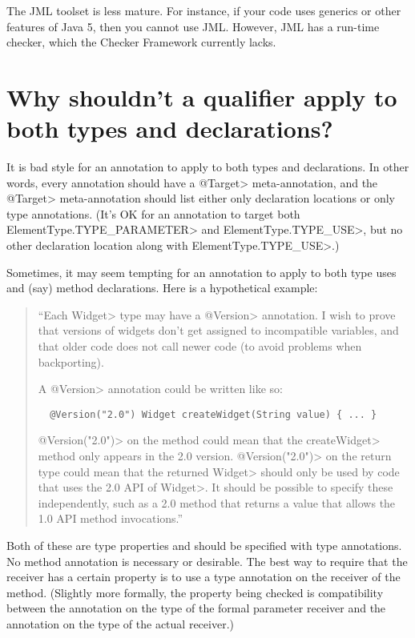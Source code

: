 The JML toolset is less mature.  For instance, if your code uses
generics or other features of Java 5, then you cannot use JML.  
However, JML has a run-time checker, which the Checker Framework currently
lacks.


\section{Why shouldn't a qualifier apply to both types and declarations?\label{faq-no-annotation-on-types-and-declarations}}

It is bad style for an annotation to apply to both types and declarations.
In other words, every annotation should have a \<@Target> meta-annotation,
and the \<@Target> meta-annotation should list either only declaration
locations or only type annotations.  (It's OK for an annotation to target
both \<ElementType.TYPE\_PARAMETER> and \<ElementType.TYPE\_USE>, but no
other declaration location along with \<ElementType.TYPE\_USE>.)

Sometimes, it may seem tempting for an annotation to apply to both type
uses and (say) method declarations.  Here is a hypothetical example:

\begin{quote}
  ``Each \<Widget> type may have a \<@Version> annotation.
  I wish to prove that versions of widgets don't get assigned to
  incompatible variables, and that older code does not call newer code (to
  avoid problems when backporting).

  A \<@Version> annotation could be written like so:

\begin{Verbatim}
  @Version("2.0") Widget createWidget(String value) { ... }
\end{Verbatim}

\<@Version("2.0")> on the method could mean that the \<createWidget> method
only appears in the 2.0 version.  \<@Version("2.0")> on the return type
could mean that the returned \<Widget> should only be used by code that
uses the 2.0 API of \<Widget>.  It should be possible to specify these
independently, such as a 2.0 method that returns a value that allows the
1.0 API method invocations.''
\end{quote}

Both of these are type properties and should be specified with type
annotations.  No method annotation is necessary or desirable.  The best way
to require that the receiver has a certain property is to use a type
annotation on the receiver of the method.  (Slightly more formally, the
property being checked is compatibility between the annotation on the type
of the formal parameter receiver and the annotation on the type of the
actual receiver.)


